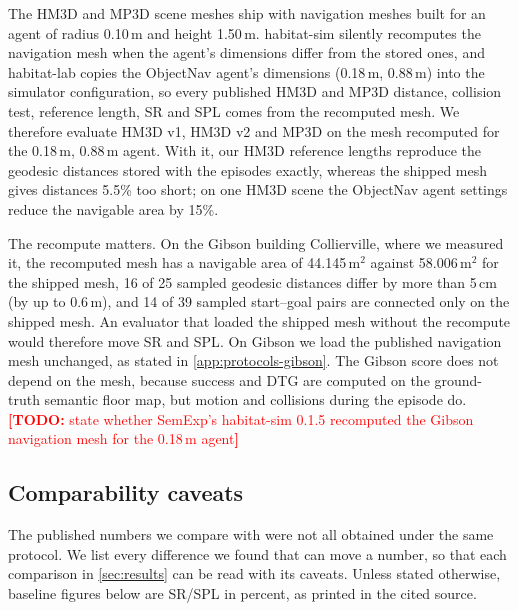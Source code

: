 \documentclass[10pt]{article}
\newcommand{\TODO}[1]{\textcolor{red}{\textbf{[TODO:} #1\textbf{]}}}
\newcommand{\SR}{\textsc{SR}\xspace}
\newcommand{\SPL}{\textsc{SPL}\xspace}
\newcommand{\DTG}{\textsc{DTG}\xspace}
\begin{document}
The HM3D and MP3D scene meshes ship with navigation meshes built for an agent of radius 0.10\,m and height 1.50\,m. habitat-sim silently recomputes the navigation mesh when the agent's dimensions differ from the stored ones, and habitat-lab copies the ObjectNav agent's dimensions (0.18\,m, 0.88\,m) into the simulator configuration, so every published HM3D and MP3D distance, collision test, reference length, \SR and \SPL comes from the recomputed mesh. We therefore evaluate HM3D v1, HM3D v2 and MP3D on the mesh recomputed for the 0.18\,m, 0.88\,m agent. With it, our HM3D reference lengths reproduce the geodesic distances stored with the episodes exactly, whereas the shipped mesh gives distances 5.5\% too short; on one HM3D scene the ObjectNav agent settings reduce the navigable area by 15\%.

The recompute matters. On the Gibson building Collierville, where we measured it, the recomputed mesh has a navigable area of 44.145\,m$^2$ against 58.006\,m$^2$ for the shipped mesh, 16 of 25 sampled geodesic distances differ by more than 5\,cm (by up to 0.6\,m), and 14 of 39 sampled start--goal pairs are connected only on the shipped mesh. An evaluator that loaded the shipped mesh without the recompute would therefore move \SR and \SPL. On Gibson we load the published navigation mesh unchanged, as stated in \cref{app:protocols-gibson}. The Gibson score does not depend on the mesh, because success and \DTG are computed on the ground-truth semantic floor map, but motion and collisions during the episode do. \TODO{state whether SemExp's habitat-sim 0.1.5 recomputed the Gibson navigation mesh for the 0.18\,m agent}

\subsection{Comparability caveats}\label{app:protocols-caveats}

The published numbers we compare with were not all obtained under the same protocol. We list every difference we found that can move a number, so that each comparison in \cref{sec:results} can be read with its caveats. Unless stated otherwise, baseline figures below are SR/SPL in percent, as printed in the cited source.
\end{document}
